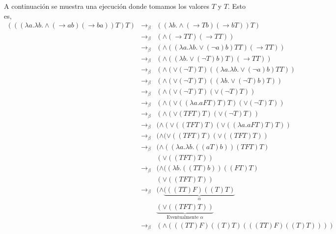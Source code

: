 \begin{enumerate}[a)]
        A continuación se muestra  una ejecución donde tomamos los valores $T$ y $T$. Esto es,
        \begin{eqnarray*}
                (((\lambda a. \lambda b. \land(\rightarrow ab)(\rightarrow ba)) T) T)
                &\rightarrow_{\beta}&
                (( \lambda b. \land(\rightarrow Tb)(\rightarrow bT)) T) \\
                &\rightarrow_{\beta}&
                ( \land(\rightarrow TT)(\rightarrow TT)) \\
                &\rightarrow_{\beta}&
                (\land((\lambda a.\lambda b.\lor (\neg a)b) TT)(\rightarrow TT))\\
                &\rightarrow_{\beta}&
                (\land((\lambda b.\lor (\neg T)b) T)(\rightarrow TT))\\
                &\rightarrow_{\beta}&
                (\land(\lor (\neg T)T)((\lambda a.\lambda b.\lor (\neg a)b) TT))\\
                &\rightarrow_{\beta}&
                (\land(\lor (\neg T)T)((\lambda b.\lor (\neg T)b) T))\\
                &\rightarrow_{\beta}&
                (\land(\lor (\neg T)T)(\lor (\neg T)T))\\
                &\rightarrow_{\beta}&
                (\land(\lor ((\lambda a.aFT) T)T)(\lor (\neg T)T))\\
                &\rightarrow_{\beta}&
                (\land(\lor (TFT)T)(\lor (\neg T)T))\\
                &\rightarrow_{\beta}&
                (\land(\lor ((TFT)T)(\lor ((\lambda a.aFT) T)T))\\
                &\rightarrow_{\beta}&
                (\land(\lor ((TFT)T)(\lor ((TFT)T))\\
                &\rightarrow_{\beta}&
                (\land((\lambda a.\lambda b. ((aT)b)) (TFT)T)\\
                & & (\lor ((TFT)T))\\
                &\rightarrow_{\beta}&
                (\land((\lambda b. ((TT)b)) ((FT)T)\\
                & & (\lor ((TFT)T))\\
                &\rightarrow_{\beta}&
                (\land \underbrace{(((TT)F) ((T)T)}_{\alpha}\\
                & & \underbrace{(\lor ((TFT)T))}_{\text{Eventualmente } \alpha}\\
                &\rightarrow_{\beta}&
                (\land(((TT)F) ((T)T)(((TT)F) ((T)T))))\\

\end{eqnarray*}
\end{enumerate}
